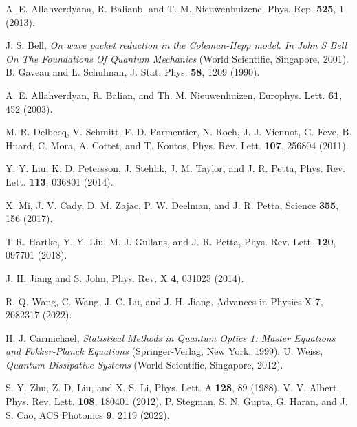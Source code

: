 \documentclass[twocolumn,showpacs,preprintnumbers,amsmath,amssymb]{revtex4}
\begin{document}
\begin{thebibliography}{99}
		
		A. E. Allahverdyana, R. Balianb, and T. M. Nieuwenhuizenc,
		Phys. Rep. \textbf{525}, 1 (2013).
		
		J. S. Bell, \emph{On wave packet reduction in the Coleman-Hepp model. In John S Bell On The Foundations Of Quantum Mechanics}
		(World Scientific, Singapore, 2001).
		B. Gaveau and L. Schulman,
		J. Stat. Phys.  \textbf{58}, 1209 (1990).
		
		A. E. Allahverdyan, R. Balian, and Th. M. Nieuwenhuizen,
		Europhys. Lett. \textbf{61},  452 (2003).
		
		M. R. Delbecq, V. Schmitt, F. D. Parmentier, N. Roch, J. J. Viennot, G. Feve, B. Huard, C. Mora, A. Cottet, and T. Kontos,
		Phys. Rev. Lett. \textbf{107}, 256804 (2011).
		
		Y. Y. Liu, K. D. Petersson, J. Stehlik, J. M. Taylor, and J. R. Petta,
		Phys. Rev. Lett. \textbf{113}, 036801 (2014).
		
		X. Mi, J. V. Cady, D. M. Zajac, P. W. Deelman, and J. R. Petta,
		Science \textbf{355}, 156 (2017).
		
		T R. Hartke, Y.-Y. Liu, M. J. Gullans, and J. R. Petta,
		Phys. Rev. Lett. \textbf{120}, 097701  (2018).
		
        J. H. Jiang and S. John, Phys. Rev. X \textbf{4}, 031025 (2014).

        R. Q. Wang, C. Wang, J. C. Lu, and J. H. Jiang, Advances in Physics:X \textbf{7}, 2082317 (2022).		

		H. J. Carmichael,
		\emph{Statistical Methods in Quantum Optics 1:
			Master Equations and Fokker-Planck Equations}  (Springer-Verlag, New York, 1999).
		U. Weiss, \emph{Quantum Dissipative Systems} (World Scientific, Singapore, 2012).
		
		
		S. Y. Zhu, Z. D. Liu, and X. S. Li,
		Phys. Lett. A \textbf{128}, 89 (1988).
		V. V. Albert,
		Phys. Rev. Lett. \textbf{108}, 180401  (2012).
		P.  Stegman, S. N. Gupta, G. Haran, and J. S. Cao,
		ACS Photonics \textbf{9}, 2119 (2022).
		

\end{thebibliography}
\end{document}
